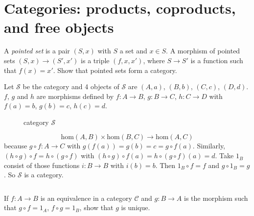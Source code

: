 \section{Categories: products, coproducts, and free objects}
\begin{ex}
    A \emph{pointed set} is a pair $(S,x)$ with $S$ a set and $x\in S$. A morphism of pointed sets $(S,x)\to (S', x')$ is a triple $(f,x,x')$, where $S\to S'$ is a function such that $f(x)=x'$. Show that pointed sets form a category.
\end{ex}

\begin{answer}
    Let $\mathcal{S}$ be the category and 4 objects of $\mathcal{S}$ are $(A,a)$, $(B,b)$, $(C,c)$, $(D,d)$. $f$, $g$ and $h$ are morphisms defined by $f:A\to B$, $g:B\to C$, $h:C\to D$ with $f(a)=b$, $g(b)=c$, $h(c)=d$.

    \begin{figure}[H]\centering
        \caption*{category $\mathcal{S}$}
    \end{figure}
    \[\mathrm{hom}(A,B)\times\mathrm{hom}(B,C)\to \mathrm{hom}(A,C)\]because $g\circ f:A\to C$ with $g(f(a))=g(b)=c=g\circ f(a)$. Similarly, $(h\circ g)\circ f=h\circ (g\circ f)$ with $(h\circ g)\circ f(a)=h\circ (g\circ f)(a)=d$. Take $1_{B}$ consist of those functions $i:B\to B$ with $i(b)=b$. Then $1_{B}\circ f=f$ and $g\circ 1_{B}=g$. So $\mathcal{S}$ is a category.
\end{answer}

$$ $$

\begin{ex}
    If $f:A\to B$ is an equivalence in a category $\mathcal{C}$ and $g:B\to A$ is the morphism such that $g\circ f=1_{A}$, $f\circ g=1_{B}$, show that $g$ is unique.
\end{ex}

